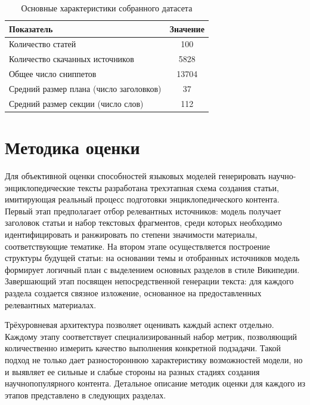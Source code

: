 \documentclass{article}
\theoremstyle{definition}
\theoremstyle{plain}
\begin{document}
\begin{table}[htb]
  \centering
  \caption{Основные характеристики собранного датасета}
  \label{tab:dataset}
  \begin{tabular}{lc}
    \hline
    \textbf{Показатель} & \textbf{Значение} \\
    \hline
    Количество статей                             & 100    \\
    \hline
    Количество скачанных источников               & 5828  \\
    \hline
    Общее число сниппетов                         & 13704  \\
    \hline
    Средний размер плана (число заголовков)       & 37    \\
    \hline
    Средний размер секции (число слов)            & 112   \\
    \hline
  \end{tabular}
\end{table}


\section*{Методика оценки}
Для объективной оценки способностей языковых моделей генерировать научно-энциклопедические тексты разработана трехэтапная схема создания статьи, имитирующая реальный процесс подготовки энциклопедического контента. 
Первый этап предполагает отбор релевантных источников: модель получает заголовок статьи и набор текстовых фрагментов, среди которых необходимо идентифицировать и ранжировать по степени значимости материалы, соответствующие тематике. 
На втором этапе осуществляется построение структуры будущей статьи: на основании темы и отобранных источников модель формирует логичный план с выделением основных разделов в стиле Википедии. 
Завершающий этап посвящен непосредственной генерации текста: для каждого раздела создается связное изложение, основанное на предоставленных релевантных материалах. 

Трёхуровневая архитектура позволяет оценивать каждый аспект отдельно.
Каждому этапу соответствует специализированный набор метрик, позволяющий количественно измерить качество выполнения конкретной подзадачи. 
Такой подход не только дает разностороннюю характеристику возможностей модели, но и выявляет ее сильные и слабые стороны на разных стадиях создания научно\-популярного контента. 
Детальное описание методик оценки для каждого из этапов представлено в следующих разделах.
\end{document}
